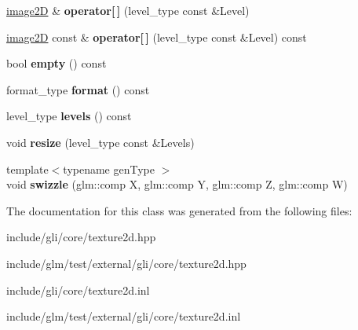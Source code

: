 \begin{DoxyCompactItemize}
\item 
\hypertarget{classgli_1_1texture2D_a0dcf956b01aaaef594b92b87da1504f6}{\hyperlink{classgli_1_1image2D}{image2\-D} \& {\bfseries operator\mbox{[}$\,$\mbox{]}} (level\-\_\-type const \&\-Level)}\label{classgli_1_1texture2D_a0dcf956b01aaaef594b92b87da1504f6}

\item 
\hypertarget{classgli_1_1texture2D_aa778750d4bdba5919e0a17cb5238118c}{\hyperlink{classgli_1_1image2D}{image2\-D} const \& {\bfseries operator\mbox{[}$\,$\mbox{]}} (level\-\_\-type const \&\-Level) const }\label{classgli_1_1texture2D_aa778750d4bdba5919e0a17cb5238118c}

\item 
\hypertarget{classgli_1_1texture2D_ad6ecacbb8e2dd2a76e1853b7c2fa30e7}{bool {\bfseries empty} () const }\label{classgli_1_1texture2D_ad6ecacbb8e2dd2a76e1853b7c2fa30e7}

\item 
\hypertarget{classgli_1_1texture2D_a4132c787df3b7db32f81afb3b0002116}{format\-\_\-type {\bfseries format} () const }\label{classgli_1_1texture2D_a4132c787df3b7db32f81afb3b0002116}

\item 
\hypertarget{classgli_1_1texture2D_a2802ff5babafccea6db551fa716e5904}{level\-\_\-type {\bfseries levels} () const }\label{classgli_1_1texture2D_a2802ff5babafccea6db551fa716e5904}

\item 
\hypertarget{classgli_1_1texture2D_a3960aedcf25ef5857f42f858add50892}{void {\bfseries resize} (level\-\_\-type const \&\-Levels)}\label{classgli_1_1texture2D_a3960aedcf25ef5857f42f858add50892}

\item 
\hypertarget{classgli_1_1texture2D_ab9d90abcdc921ebc096beaec9a86f2d1}{{\footnotesize template$<$typename gen\-Type $>$ }\\void {\bfseries swizzle} (glm\-::comp \-X, glm\-::comp \-Y, glm\-::comp \-Z, glm\-::comp \-W)}\label{classgli_1_1texture2D_ab9d90abcdc921ebc096beaec9a86f2d1}

\end{DoxyCompactItemize}


\-The documentation for this class was generated from the following files\-:\begin{DoxyCompactItemize}
\item 
include/gli/core/texture2d.\-hpp\item 
include/glm/test/external/gli/core/texture2d.\-hpp\item 
include/gli/core/texture2d.\-inl\item 
include/glm/test/external/gli/core/texture2d.\-inl\end{DoxyCompactItemize}
